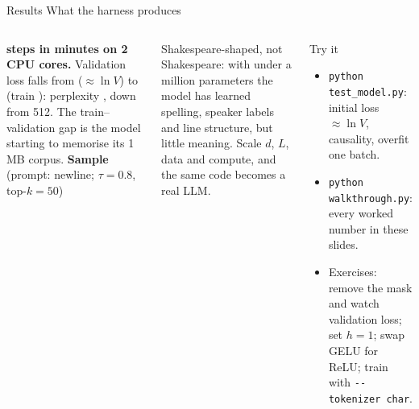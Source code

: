 \documentclass[aspectratio=169,10pt]{beamer}
\begin{document}
\begin{frame}[fragile]{Results \textbullet{} What the harness produces}
\begin{columns}[T,onlytextwidth]
\centering
{}

\vspace{-1mm}
\raggedright
{\footnotesize
\textbf{\resSteps{} steps in \resMinutes{} minutes on 2 CPU cores.} Validation loss falls from
\resInit{} ($\approx\ln V$) to \resVal{} (train \resTrain): perplexity \resPpl, down from 512.
The train--validation gap is the model starting to memorise its 1\,MB corpus.
}
\small
\textbf{Sample} (prompt: newline; $\tau=0.8$, top-$k=50$)

\vspace{-1mm}
{\footnotesize Shakespeare-shaped, not Shakespeare: with under a million parameters the model has learned
spelling, speaker labels and line structure, but little meaning. Scale $d$, $L$, data and compute, and the
same code becomes a real LLM.}

\vspace{1.5mm}
\begin{block}{Try it}
\footnotesize
\begin{itemize}
  \item \texttt{python test\_model.py}: initial loss $\approx\ln V$, causality, overfit one batch.
  \item \texttt{python walkthrough.py}: every worked number in these slides.
  \item Exercises: remove the mask and watch validation loss; set $h=1$; swap GELU for ReLU;
        train with \texttt{-{}-tokenizer char}.
\end{itemize}
\end{block}
\end{columns}
\end{frame}
\end{document}

